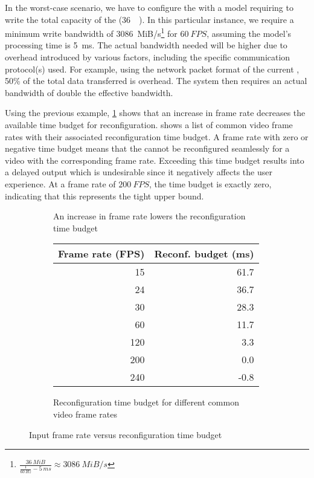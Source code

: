 In the worst-case scenario, we have to configure the \graicore{} with a model requiring to write the total capacity of the \graicore{} (\SI{36}{\mebi\byte}).
In this particular instance, we require a minimum write bandwidth of \SI{3086}{MiB/s}\footnote{$\frac{\SI{36}{MiB}}{\frac{1}{\SI{60}{Hz}} - \SI{5}{ms}} \approx \SI{3086}{MiB/s}$} for $\SI{60}{FPS}$, assuming the model's processing time is \SI{5}{ms}.
The actual bandwidth needed will be higher due to overhead introduced by various factors, including the specific communication protocol(s) used.
For example, using the network packet format of the current \confignoc{}, 50\% of the total data transferred is overhead.
The system then requires an actual bandwidth of double the effective bandwidth.

Using the previous example, \cref{fig:frame_rate_versus_time_budget} shows that an increase in frame rate decreases the available time budget for reconfiguration.
 shows a list of common video frame rates with their associated reconfiguration time budget.
A frame rate with zero or negative time budget means that the \graicore{} cannot be reconfigured seamlessly for a video with the corresponding frame rate.
Exceeding this time budget results into a delayed output which is undesirable since it negatively affects the user experience.
At a frame rate of $\SI{200}{FPS}$, the time budget is exactly zero, indicating that this represents the tight upper bound.

\begin{figure}[htbp]
    \centering
    \begin{subfigure}[b]{0.48\textwidth}
        \begin{adjustbox}{width=\linewidth}
        
        \end{adjustbox}
        \caption{An increase in frame rate lowers the reconfiguration time budget}
        \label{fig:frame_rate_versus_time_budget}
    \end{subfigure}
    \hfill
    \begin{subfigure}[b]{0.48\textwidth}
        \begin{tabular}{@{}rr@{}}
        \toprule
        Frame rate (FPS) & Reconf. budget (ms) \\ \midrule
        15               & 61.7                \\
        24               & 36.7                \\
        30               & 28.3                \\
        60               & 11.7                \\
        120              & 3.3                 \\
        200              & 0.0                 \\
        240              & -0.8                \\ \bottomrule
        \end{tabular}
        \caption{Reconfiguration time budget for different common video frame rates}
        \label{tab:common_fps}
    \end{subfigure}
    \caption[]{Input frame rate versus reconfiguration time budget}
\end{figure}

